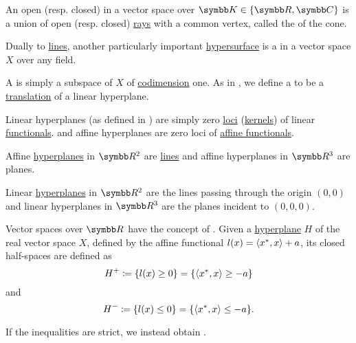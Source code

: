 \begin{definition}\label{def:geometric_cone}
  An open (resp. closed)  in a vector space over \( \BK \in \{ \BR, \BC \} \) is a union of open (resp. closed) \hyperref[def:geometric_ray]{rays} with a common vertex, called the  of the cone.
\end{definition}

\begin{definition}\label{def:hyperplane}
  Dually to \hyperref[def:geometric_line]{lines}, another particularly important \hyperref[def:hypersurface]{hypersurface} is a  in a vector space \( X \) over any field.

  \begin{DefEnum}
     A  is simply a subspace of \( X \) of \hyperref[def:vector_space_dimension]{codimension} one. As in , we define a  to be a \hyperref[def:euclidean_transformation/translation]{translation} of a linear hyperplane.

     Linear hyperplanes (as defined in ) are simply zero \hyperref[def:zero_locus]{loci} (\hyperref[def:semiring_kernel]{kernels}) of linear \hyperref[def:linear_operator]{functionals}. and affine hyperplanes are zero loci of \hyperref[def:affine_operator]{affine functionals}.
  \end{DefEnum}
\end{definition}

\begin{example}\label{ex:hyperplanes}
  Affine \hyperref[def:hyperplane]{hyperplanes} in \( \BR^2 \) are \hyperref[def:geometric_line]{lines} and affine hyperplanes in \( \BR^3 \) are planes.

  Linear \hyperref[def:hyperplane]{hyperplanes} in \( \BR^2 \) are the lines passing through the origin \( (0, 0) \) and linear hyperplanes in \( \BR^3 \) are the planes incident to \( (0, 0, 0) \).
\end{example}

\begin{definition}\label{def:half_space}
  Vector spaces over \( \BR \) have the concept of . Given a \hyperref[def:hyperplane]{hyperplane} \( H \) of the real vector space \( X \), defined by the affine functional \( l(x) = \left\langle x^*, x \right\rangle + a \), its closed half-spaces are defined as
  \begin{equation*}
    H^+ \coloneqq \{ l(x) \geq 0 \} = \{ \left\langle x^*, x \right\rangle \geq -a \}
  \end{equation*}
  and
  \begin{equation*}
    H^- \coloneqq \{ l(x) \leq 0 \} = \{ \left\langle x^*, x \right\rangle \leq -a \}.
  \end{equation*}

  If the inequalities are strict, we instead obtain .
\end{definition}

